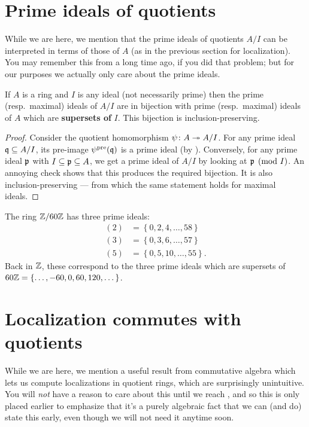 \section{Prime ideals of quotients}
While we are here, we mention that
the prime ideals of quotients $A/I$
can be interpreted in terms of those of $A$
(as in the previous section for localization).
You may remember this from 
a long time ago, if you did that problem;
but for our purposes we actually only care about the prime ideals.
\begin{proposition}
	\label{prop:prime_quotient}
	If $A$ is a ring and $I$ is any ideal (not necessarily prime)
	then the prime (resp.\ maximal) ideals of $A/I$
	are in bijection with prime (resp.\ maximal) ideals of $A$
	which are \textbf{supersets of} $I$.
	This bijection is inclusion-preserving.
\end{proposition}
\begin{proof}
	Consider the quotient homomorphism $\psi \colon A \twoheadrightarrow A/I$.
	For any prime ideal $\mathfrak q \subseteq A/I$,
	its pre-image $\psi^{\text{pre}}(\mathfrak q)$ is a prime ideal
	(by ).
	Conversely, for any prime ideal $\mathfrak p$
	with $I \subseteq \mathfrak p \subseteq A$,
	we get a prime ideal of $A/I$ by looking at $\mathfrak p \pmod I$.
	An annoying check shows that this produces the required bijection.
	It is also inclusion-preserving --- from which
	the same statement holds for maximal ideals.
\end{proof}
\begin{example}
	The ring $\mathbb Z/60\mathbb Z$ has three prime ideals:
	\begin{align*}
		(2) &= \left\{ 0, 2, 4, \dots, 58 \right\} \\
		(3) &= \left\{ 0, 3, 6, \dots, 57 \right\} \\
		(5) &= \left\{ 0, 5, 10, \dots, 55 \right\}.
	\end{align*}
	Back in $\mathbb Z$, these correspond to the three prime ideals
	which are supersets of
	$60\mathbb Z = \left\{ \dots, -60, 0, 60, 120, \dots \right\}$.
\end{example}

\section{Localization commutes with quotients}
While we are here, we mention a useful result from
commutative algebra which lets us compute localizations in quotient rings,
which are surprisingly unintuitive.
You will \emph{not} have a reason to care about this
until we reach ,
and so this is only placed earlier to emphasize that it's
a purely algebraic fact that we can (and do) state this early,
even though we will not need it anytime soon.

